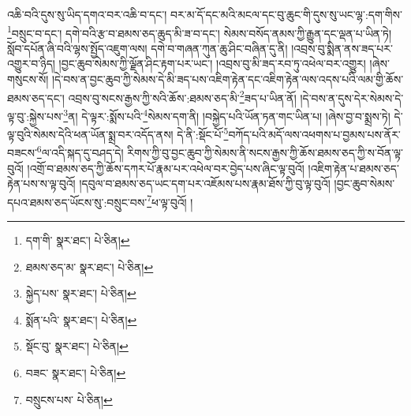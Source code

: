 འཆི་བའི་དུས་སུ་ཡིད་དགའ་བར་འཆི་བ་དང་། བར་མ་དོ་དང་མའི་མངལ་དང་བུ་ཆུང་གི་དུས་སུ་ཡང་ལྷ་:དག་གིས་\footnote{དག་གི་  སྣར་ཐང་།  པེ་ཅིན། }བསྲུང་བ་དང་། དགེ་བའི་རྩ་བ་ཐམས་ཅད་ཆུད་མི་ཟ་བ་དང་། སེམས་བསོད་ནམས་ཀྱི་རྒྱུན་དང་ལྡན་པ་ཡིན་ཏེ། སློབ་དཔོན་ཞི་བའི་ལྷས་སྤྱོད་འཇུག་ལས། དགེ་བ་གཞན་ཀུན་ཆུ་ཤིང་བཞིན་དུ་ནི། །འབྲས་བུ་སྨིན་ནས་ཟད་པར་འགྱུར་བ་ཉིད། །བྱང་ཆུབ་སེམས་ཀྱི་ལྗོན་ཤིང་རྟག་པར་ཡང་། །འབྲས་བུ་མི་ཟད་རབ་ཏུ་འཕེལ་བར་འགྱུར། །ཞེས་གསུངས་སོ། །དེ་བས་ན་བྱང་ཆུབ་ཀྱི་སེམས་དེ་མི་ཟད་པས་འཇིག་རྟེན་དང་འཇིག་རྟེན་ལས་འདས་པའི་ལམ་གྱི་ཆོས་ཐམས་ཅད་དང་། འབྲས་བུ་སངས་རྒྱས་ཀྱི་སའི་ཆོས་:ཐམས་ཅད་མི་\footnote{ཐམས་ཅད་མ་  སྣར་ཐང་།  པེ་ཅིན། }ཟད་པ་ཡིན་ནོ། །དེ་བས་ན་དུས་དེར་སེམས་དེ་ལྟ་བུ་:སྐྱེས་པས་\footnote{སྐྱེད་པས་  སྣར་ཐང་།  པེ་ཅིན། }ན། དེ་ལྟར་:སྨོས་པའི་\footnote{སྨོན་པའི་  སྣར་ཐང་།  པེ་ཅིན། }སེམས་དག་ནི། །བསྐྱེད་པའི་ཡོན་ཏན་གང་ཡིན་པ། །ཞེས་བྱ་བ་སྨྲས་ཏེ། དེ་ལྟ་བུའི་སེམས་དེའི་ཕན་ཡོན་སྨྲ་བར་འདོད་ནས། དེ་ནི་:སྡོང་པོ་\footnote{སྡོང་བུ་  སྣར་ཐང་།  པེ་ཅིན། }བཀོད་པའི་མདོ་ལས་འཕགས་པ་བྱམས་པས་ནོར་བཟངས་\footnote{བཟང་  སྣར་ཐང་།  པེ་ཅིན། }ལ་འདི་སྐད་དུ་བཤད་དེ། རིགས་ཀྱི་བུ་བྱང་ཆུབ་ཀྱི་སེམས་ནི་སངས་རྒྱས་ཀྱི་ཆོས་ཐམས་ཅད་ཀྱི་ས་བོན་ལྟ་བུའོ། །འགྲོ་བ་ཐམས་ཅད་ཀྱི་ཆོས་དཀར་པོ་རྣམ་པར་འཕེལ་བར་བྱེད་པས་ཞིང་ལྟ་བུའོ། །འཇིག་རྟེན་པ་ཐམས་ཅད་རྟེན་པས་ས་ལྟ་བུའོ། །དབུལ་བ་ཐམས་ཅད་ཡང་དག་པར་འཇོམས་པས་རྣམ་ཐོས་ཀྱི་བུ་ལྟ་བུའོ། །བྱང་ཆུབ་སེམས་དཔའ་ཐམས་ཅད་ཡོངས་སུ་:བསྲུང་བས་\footnote{བསྲུངས་པས་  པེ་ཅིན། }ཕ་ལྟ་བུའོ། །
